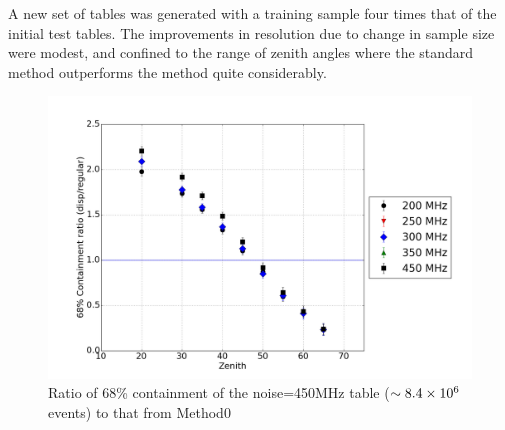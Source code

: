 \documentclass[main.tex]{subfiles}
\begin{document}
A new set of \disp tables was generated with a training sample four times that of the initial test tables. The improvements in resolution due to change in sample size were modest, and confined to the range of zenith angles where the standard method outperforms the \disp method quite considerably.

\begin{figure}[htbp]
  \centering
  \includegraphics[width=0.8\linewidth]{images/disp_450x4size_ratio_xzen}
  \caption[\disp table reconstruction vs noise]{Ratio of 68\% containment of the noise=450MHz \disp table ($\sim 8.4\times 10^{6}$ events) to that from Method0}
  \label{fig:disp_ratio_450x4}
\end{figure}
\end{document}
